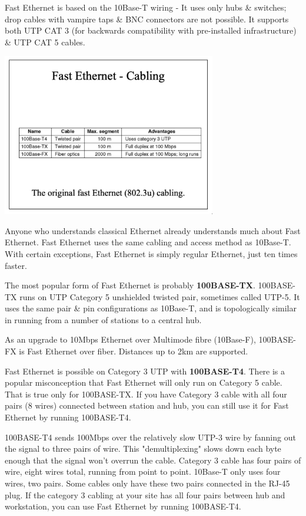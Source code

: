 \documentclass[11pt]{article}
\begin{document}
Fast Ethernet is based on the 10Base-T wiring - It uses only hubs \& switches; drop cables with vampire taps \& 
BNC connectors are not possible.
It supports both UTP CAT 3 (for backwards compatibility with pre-installed infrastructure) \& UTP CAT 5 cables.

\begin{center}
    \includegraphics[width=0.7\textwidth]{fastethernetcabling.png}
\end{center}

Anyone who understands classical Ethernet already understands much about Fast Ethernet. 
Fast Ethernet uses the same cabling and access method as 10Base-T. 
With certain exceptions, Fast Ethernet is simply regular Ethernet, just ten times faster. 

The most popular form of Fast Ethernet is probably \textbf{100BASE-TX}. 
100BASE-TX runs on UTP Category 5 unshielded twisted pair, sometimes called UTP-5.
It uses the same pair \& pin configurations as 10Base-T, and is topologically similar in running from a number of
stations to a central hub. 

As an upgrade to 10Mbps Ethernet over Multimode fibre (10Base-F), 100BASE-FX is Fast 
Ethernet over fiber. Distances up to 2km are supported.

Fast Ethernet is possible on Category 3 UTP with \textbf{100BASE-T4}.
There is a popular misconception that Fast Ethernet will only run on Category 5 cable.
That is true only for 100BASE-TX.
If you have Category 3 cable with all four pairs (8 wires) connected between station and hub, you can still use
it for Fast Ethernet by running 100BASE-T4. 

100BASE-T4 sends 100Mbps over the relatively slow UTP-3 wire by fanning out the signal to three pairs of wire.
This "demultiplexing" slows down each byte enough that the signal won't overrun the cable.
Category 3 cable has four pairs of wire, eight wires total, running from point to point.
10Base-T only uses four wires, two pairs. Some cables only have these 
two pairs connected in the RJ-45 plug.
If the category 3 cabling at your site has all four pairs between hub and workstation, you can use Fast Ethernet
by running 100BASE-T4.
\end{document}
